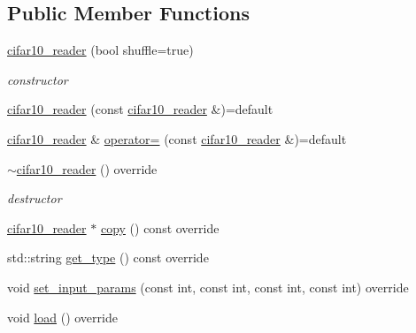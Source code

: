 \subsection*{Public Member Functions}
\begin{DoxyCompactItemize}
\item 
\hyperlink{classlbann_1_1cifar10__reader_a3e4fca66c9bd38798e56379d4a2cd6c0}{cifar10\+\_\+reader} (bool shuffle=true)
\begin{DoxyCompactList}\small\item\em constructor \end{DoxyCompactList}\item 
\hyperlink{classlbann_1_1cifar10__reader_a1b4c310dc2bd5e78b197e334fc2b93d5}{cifar10\+\_\+reader} (const \hyperlink{classlbann_1_1cifar10__reader}{cifar10\+\_\+reader} \&)=default
\item 
\hyperlink{classlbann_1_1cifar10__reader}{cifar10\+\_\+reader} \& \hyperlink{classlbann_1_1cifar10__reader_aa97e6d18d0ac3bb42da58c11d5d2ca17}{operator=} (const \hyperlink{classlbann_1_1cifar10__reader}{cifar10\+\_\+reader} \&)=default
\item 
\hyperlink{classlbann_1_1cifar10__reader_a7830763d48562f43af206d2b0f4497c3}{$\sim$cifar10\+\_\+reader} () override
\begin{DoxyCompactList}\small\item\em destructor \end{DoxyCompactList}\item 
\hyperlink{classlbann_1_1cifar10__reader}{cifar10\+\_\+reader} $\ast$ \hyperlink{classlbann_1_1cifar10__reader_a32206d0f0f7baf2471ed589ec4db356b}{copy} () const override
\item 
std\+::string \hyperlink{classlbann_1_1cifar10__reader_a0922990dbef860040a7ec2a99a3d3ba2}{get\+\_\+type} () const override
\item 
void \hyperlink{classlbann_1_1cifar10__reader_a3915005f1278a840869b8519c30c808b}{set\+\_\+input\+\_\+params} (const int, const int, const int, const int) override
\item 
void \hyperlink{classlbann_1_1cifar10__reader_aee797d547e651e1b0fd5dedc95edd0e0}{load} () override
\end{DoxyCompactItemize}
